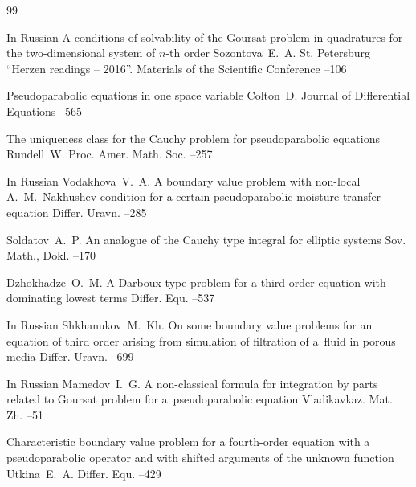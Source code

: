 \begin{thebibliography}{99}


\lang In Russian
\paper A conditions of solvability of the Goursat problem in
quadratures for the two-dimensional system of $n$-th order
\by  Sozontova~E.~A.
\publaddr St. Petersburg
\inbook “Herzen readings – 2016”.  Materials of the Scientific Conference
--106


\paper    Pseudoparabolic equations in one space variable 
\by  Colton~D.
\jour Journal of Differential Equations
--565


\paper  The uniqueness class for the Cauchy problem for pseudoparabolic equations
\by   Rundell~W.
\jour Proc. Amer. Math. Soc. 
--257


\lang In Russian
\by Vodakhova~V.~A.
\paper A boundary value problem with non-local A.~M.~Nakhushev condition for a certain pseudoparabolic moisture transfer equation
\jour Differ. Uravn. 
--285 




\by Soldatov~A.~P.
\paper An analogue of the Cauchy type integral for elliptic systems
\jour Sov. Math., Dokl. 
--170 

\by Dzhokhadze~O.~M.
\paper A Darboux-type problem for a third-order equation with dominating lowest terms
\jour Differ. Equ.
--537

\lang In Russian
\by Shkhanukov~M.~Kh.
\paper On some boundary value problems for an equation of third order arising from simulation of filtration of a~fluid in porous media
\jour Differ. Uravn. 
--699 

\lang In Russian
\by Mamedov~I.~G.
\paper A non-classical formula for integration by parts related to Goursat problem for a~pseudoparabolic equation
\jour Vladikavkaz. Mat. Zh.
--51


\paper 	 Characteristic boundary value problem for a fourth-order equation with a pseudoparabolic operator and with shifted arguments of the unknown function 
\by  Utkina~E.~A.
\jour Differ. Equ.
--429



\end{thebibliography}
